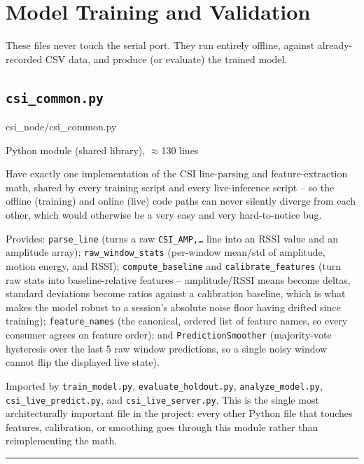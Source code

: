 \documentclass[11pt,a4paper]{article}
\newcommand{\filepath}[1]{{\small\ttfamily\color{pathgray}#1}}
\newcommand{\fileentry}[6]{%
    \subsection{\texttt{#1}}
    \filepath{#2}
    \vspace{0.15cm}
    \begin{description}[leftmargin=2.6cm, style=nextline]
        \item[Type] #3
        \item[Objective] #4
        \item[Role] #5
        \item[Connections] #6
    \end{description}
    \vspace{0.2cm}
    \hrule
    \vspace{0.3cm}
}
\begin{document}
\section{Model Training and Validation}

These files never touch the serial port. They run entirely offline,
against already-recorded CSV data, and produce (or evaluate) the trained
model.

\fileentry
{csi\_common.py}
{csi\_node/csi\_common.py}
{Python module (shared library), \(\approx\)130 lines}
{Have exactly one implementation of the CSI line-parsing and
    feature-extraction math, shared by every training script and every
    live-inference script -- so the offline (training) and online
    (live) code paths can never silently diverge from each other, which
    would otherwise be a very easy and very hard-to-notice bug.}
{Provides: \texttt{parse\_line} (turns a raw \texttt{CSI\_AMP,\ldots}
    line into an RSSI value and an amplitude array);
    \texttt{raw\_window\_stats} (per-window mean/std of amplitude,
    motion energy, and RSSI); \texttt{compute\_baseline} and
    \texttt{calibrate\_features} (turn raw stats into baseline-relative
    features -- amplitude/RSSI means become deltas, standard deviations
    become ratios against a calibration baseline, which is what makes
    the model robust to a session's absolute noise floor having drifted
    since training); \texttt{feature\_names} (the canonical, ordered
    list of feature names, so every consumer agrees on feature order);
    and \texttt{PredictionSmoother} (majority-vote hysteresis over the
    last 5 raw window predictions, so a single noisy window cannot flip
    the displayed live state).}
{Imported by \texttt{train\_model.py}, \texttt{evaluate\_holdout.py},
    \texttt{analyze\_model.py}, \texttt{csi\_live\_predict.py}, and
    \texttt{csi\_live\_server.py}. This is the single most
    architecturally important file in the project: every other Python
    file that touches features, calibration, or smoothing goes through
    this module rather than reimplementing the math.}
\end{document}
